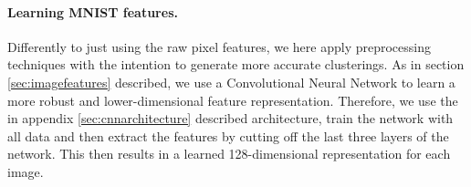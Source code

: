 \paragraph{Learning MNIST features.} Differently to just using the raw pixel features, we here apply preprocessing techniques with the intention to generate more accurate clusterings. As in section \ref{sec:imagefeatures} described, we use a Convolutional Neural Network to learn a more robust and lower-dimensional feature representation. Therefore, we use the in appendix \ref{sec:cnnarchitecture} described architecture, train the network with all data and then extract the features by cutting off the last three layers of the network. This then results in a learned 128-dimensional representation for each image.



